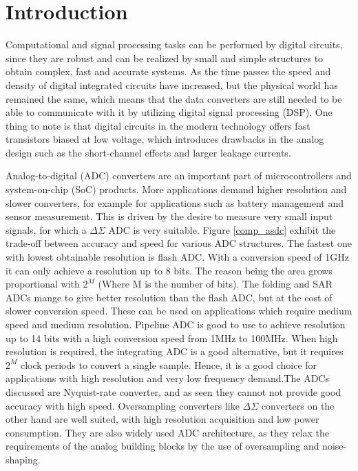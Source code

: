 \chapter{Introduction}

Computational and signal processing tasks can be performed by digital circuits, since they are robust and can be realized by small and simple structures to obtain complex, fast and accurate systems. As the time passes the speed and density of digital integrated circuits have increased, but the physical world has remained the same, which means that the data converters are still needed to be able to communicate with it by utilizing digital signal processing (DSP). One thing to note is that digital circuits in the modern technology offers fast transistors biased at low voltage, which introduces drawbacks in the analog design such as the short-channel effects and larger leakage currents.  

Analog-to-digital (ADC) converters are an important part of microcontrollers and system-on-chip (SoC) products. More applications demand higher resolution and slower converters, for example for applications such as battery management and sensor measurement. This is driven by the desire to measure very small input signals, for which a $\Delta\Sigma$ ADC is very suitable. Figure \ref{comp_asdc} exhibit  the trade-off between accuracy and speed for various ADC structures. The fastest one with lowest obtainable resolution is flash ADC. With a conversion speed of 1GHz it can only achieve a resolution up to 8 bits. The reason being the area grows proportional with $2^M$ (Where M is the number of bits). The folding and SAR ADCs mange to give better resolution than the flash ADC, but at the cost of slower conversion speed. These can be used on applications which require medium speed and medium resolution. Pipeline ADC is good to use to achieve resolution up to 14 bits with a high conversion speed from 1MHz to 100MHz. When high resolution is required, the integrating ADC is a good alternative, but it requires $2^M$ clock periods to convert a single sample. Hence, it is a good choice for applications with high resolution and very low frequency demand.The ADCs discussed are Nyquist-rate converter, and as seen they cannot not provide good accuracy with high speed.  Oversampling converters like $\Delta\Sigma$ converters on the other hand are well suited, with high resolution acquisition and low power consumption. They are also widely used ADC architecture, as they relax the requirements of the analog building blocks by the use of oversampling and noise-shaping.

